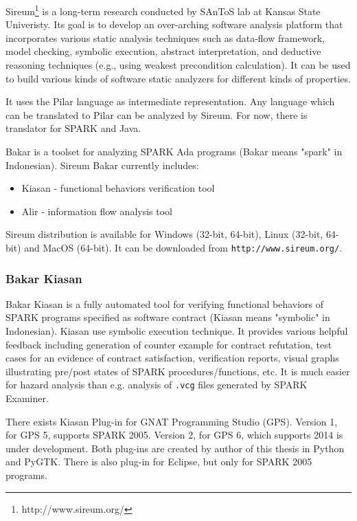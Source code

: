 Sireum\footnote{http://www.sireum.org/} is a long-term research conducted by SAnToS lab at Kansas State Univeristy. Its goal is to develop an over-arching software analysis platform that incorporates various static analysis techniques such as data-flow framework, model checking, symbolic execution, abstract interpretation, and deductive reasoning techniques (e.g., using weakest precondition calculation). It can be used to build various kinds of software static analyzers for different kinds of properties. 

It uses the Pilar language \cite{Pilar:Paper} as intermediate representation. Any language which can be translated to Pilar can be analyzed by Sireum. For now, there is translator for SPARK and Java.

Bakar is a toolset for analyzing SPARK Ada programs (Bakar means "spark" in Indonesian). Sireum Bakar currently includes:
\begin{itemize}
	\item Kiasan - functional behaviors verification tool
	\item Alir - information flow analysis tool	
\end{itemize}

Sireum distribution is available for Windows (32-bit, 64-bit), Linux (32-bit, 64-bit) and MacOS (64-bit). It can be downloaded from \lstinline{http://www.sireum.org/}.


\subsubsection{Bakar Kiasan}

Bakar Kiasan \cite{Kiasan:Paper} is a fully automated tool for verifying functional behaviors of SPARK programs specified as software contract (Kiasan means "symbolic" in Indonesian). Kiasan use symbolic execution technique. It provides various helpful feedback including generation of counter example for contract refutation, test cases for an evidence of contract satisfaction, verification reports, visual graphs illustrating pre/post states of SPARK procedures/functions, etc. It is much easier for hazard analysis than e.g. analysis of \lstinline{.vcg} files generated by SPARK Examiner.

There exists Kiasan Plug-in for GNAT Programming Studio (GPS). Version 1, for GPS 5, supports SPARK 2005. Version 2, for GPS 6, which supports 2014 is under development. Both plug-ins are created by author of this thesis in Python and PyGTK. There is also plug-in for Eclipse, but only for SPARK 2005 programs.

